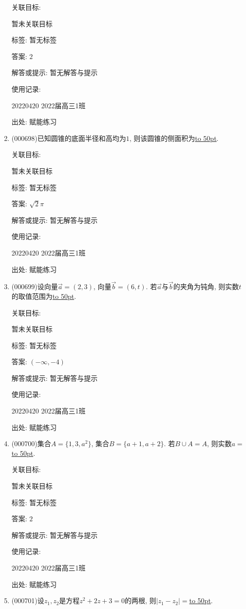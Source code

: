 \documentclass[10pt,a4paper]{article}
\newcommand{\blank}[1]{\underline{\hbox to #1pt{}}}
\begin{document}
\begin{enumerate}[1.]
关联目标:

暂未关联目标



标签: 暂无标签

答案: $2$

解答或提示: 暂无解答与提示

使用记录:

20220420	2022届高三1班	


出处: 赋能练习
\item { (000698)}已知圆锥的底面半径和高均为$1$, 则该圆锥的侧面积为\blank{50}.


关联目标:

暂未关联目标



标签: 暂无标签

答案: $\sqrt 2\pi$

解答或提示: 暂无解答与提示

使用记录:

20220420	2022届高三1班	


出处: 赋能练习
\item { (000699)}设向量$\overrightarrow{a}=(2,3)$, 向量$\overrightarrow{b}=(6,t)$. 若$\overrightarrow{a}$与$\overrightarrow{b}$的夹角为钝角, 则实数$t$的取值范围为\blank{50}.


关联目标:

暂未关联目标



标签: 暂无标签

答案: $(-\infty,-4)$

解答或提示: 暂无解答与提示

使用记录:

20220420	2022届高三1班	


出处: 赋能练习
\item { (000700)}集合$A=\{1,3,a^2\}$, 集合$B=\{a+1,a+2\}$. 若$B\cup A=A$, 则实数$a=$\blank{50}.


关联目标:

暂未关联目标



标签: 暂无标签

答案: $2$

解答或提示: 暂无解答与提示

使用记录:

20220420	2022届高三1班	


出处: 赋能练习
\item { (000701)}设$z_1,z_2$是方程$z^2+2z+3=0$的两根, 则$|z_1-z_2|=$\blank{50}.



\end{enumerate}
\end{document}
